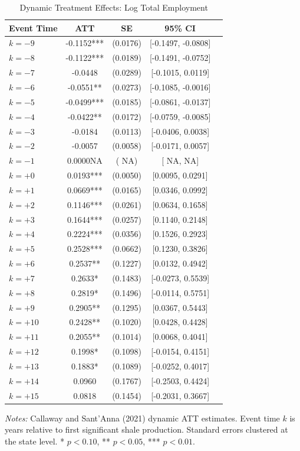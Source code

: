 \begin{table}[H]
\centering
\caption{Dynamic Treatment Effects: Log Total Employment}
\begin{threeparttable}
\begin{tabular}{lcccl}
\toprule
Event Time & ATT & SE & 95\% CI & \\
\midrule
$k = -9$ & -0.1152*** & (0.0176) & [-0.1497, -0.0808] & \\
$k = -8$ & -0.1122*** & (0.0189) & [-0.1491, -0.0752] & \\
$k = -7$ & -0.0448 & (0.0289) & [-0.1015, 0.0119] & \\
$k = -6$ & -0.0551** & (0.0273) & [-0.1085, -0.0016] & \\
$k = -5$ & -0.0499*** & (0.0185) & [-0.0861, -0.0137] & \\
$k = -4$ & -0.0422** & (0.0172) & [-0.0759, -0.0085] & \\
$k = -3$ & -0.0184 & (0.0113) & [-0.0406, 0.0038] & \\
$k = -2$ & -0.0057 & (0.0058) & [-0.0171, 0.0057] & \\
$k = -1$ & 0.0000NA & (   NA) & [   NA,    NA] & \\
$k = +0$ & 0.0193*** & (0.0050) & [0.0095, 0.0291] & \\
$k = +1$ & 0.0669*** & (0.0165) & [0.0346, 0.0992] & \\
$k = +2$ & 0.1146*** & (0.0261) & [0.0634, 0.1658] & \\
$k = +3$ & 0.1644*** & (0.0257) & [0.1140, 0.2148] & \\
$k = +4$ & 0.2224*** & (0.0356) & [0.1526, 0.2923] & \\
$k = +5$ & 0.2528*** & (0.0662) & [0.1230, 0.3826] & \\
$k = +6$ & 0.2537** & (0.1227) & [0.0132, 0.4942] & \\
$k = +7$ & 0.2633* & (0.1483) & [-0.0273, 0.5539] & \\
$k = +8$ & 0.2819* & (0.1496) & [-0.0114, 0.5751] & \\
$k = +9$ & 0.2905** & (0.1295) & [0.0367, 0.5443] & \\
$k = +10$ & 0.2428** & (0.1020) & [0.0428, 0.4428] & \\
$k = +11$ & 0.2055** & (0.1014) & [0.0068, 0.4041] & \\
$k = +12$ & 0.1998* & (0.1098) & [-0.0154, 0.4151] & \\
$k = +13$ & 0.1883* & (0.1089) & [-0.0252, 0.4017] & \\
$k = +14$ & 0.0960 & (0.1767) & [-0.2503, 0.4424] & \\
$k = +15$ & 0.0818 & (0.1454) & [-0.2031, 0.3667] & \\
\bottomrule
\end{tabular}
\begin{tablenotes}[flushleft]
\small
\item \textit{Notes:} Callaway and Sant'Anna (2021) dynamic ATT estimates. Event time $k$ is years relative to first significant shale production. Standard errors clustered at the state level. * $p<0.10$, ** $p<0.05$, *** $p<0.01$.
\end{tablenotes}
\end{threeparttable}
\label{tab:eventstudy}
\end{table}
